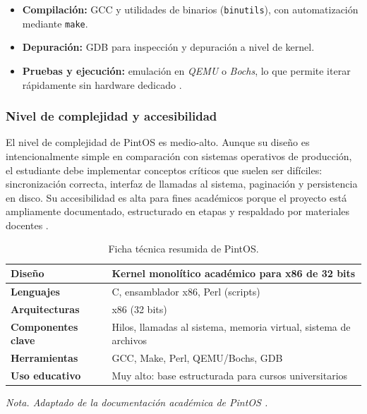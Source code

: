 \begin{itemize}
    \item \textbf{Compilación:} GCC y utilidades de binarios (\texttt{binutils}), con automatización mediante \texttt{make}.
    \item \textbf{Depuración:} GDB para inspección y depuración a nivel de kernel.
    \item \textbf{Pruebas y ejecución:} emulación en \textit{QEMU} o \textit{Bochs}, lo que permite iterar rápidamente sin hardware dedicado \cite{pintos_stanford}.
\end{itemize}


\subsubsection{Nivel de complejidad y accesibilidad}
El nivel de complejidad de PintOS es medio-alto. Aunque su diseño es intencionalmente simple en comparación con sistemas operativos de producción, el estudiante debe implementar conceptos críticos que suelen ser difíciles: sincronización correcta, interfaz de llamadas al sistema, paginación y persistencia en disco. Su accesibilidad es alta para fines académicos porque el proyecto está ampliamente documentado, estructurado en etapas y respaldado por materiales docentes \cite{pintos_stanford, pintos_purpose}.

\begin{table}[H]
    \centering
    \caption{Ficha técnica resumida de PintOS.}
    \vspace{2mm}
    \begin{tabular}{p{4cm}p{10cm}}
        \hline
        \textbf{Diseño}            & Kernel monolítico académico para x86 de 32 bits \\ \hline
        \textbf{Lenguajes}         & C, ensamblador x86, Perl (scripts) \\
        \textbf{Arquitecturas}     & x86 (32 bits) \\
        \textbf{Componentes clave} & Hilos, llamadas al sistema, memoria virtual, sistema de archivos \\
        \textbf{Herramientas}      & GCC, Make, Perl, QEMU/Bochs, GDB \\
        \textbf{Uso educativo}     & Muy alto: base estructurada para cursos universitarios \\
        \hline
    \end{tabular}
    \vspace{1mm}
    \textit{Nota. Adaptado de la documentación académica de PintOS \cite{pintos_stanford, pintos_purpose}.}
\end{table}

